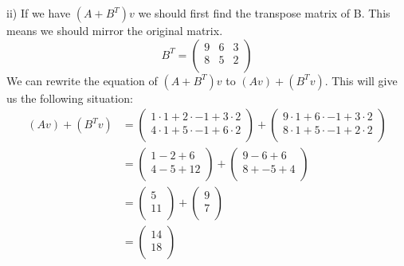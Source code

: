 \documentclass[a4paper]{article}
\begin{document}
ii) If we have $(A + B^T)v$ we should first find the transpose matrix of B. This means we should mirror the original matrix.
\[
B^T =
\left(
\begin{array}{ccc}
9 & 6 & 3 \\
8 & 5 & 2 \\
\end{array}
\right)
\]
We can rewrite the equation of $(A + B^T)v$ to $(Av)+(B^Tv)$. This will give us the following situation:
\begin{align*}
(Av)+(B^Tv) &=
\left(
\begin{array}{c}
1 \cdot 1 + 2 \cdot -1 + 3 \cdot 2 \\
4 \cdot 1 + 5 \cdot -1 + 6 \cdot 2 \\
\end{array}
\right)
+
\left(
\begin{array}{c}
9 \cdot 1 + 6 \cdot -1 + 3 \cdot 2 \\
8 \cdot 1 + 5 \cdot -1 + 2 \cdot 2 \\
\end{array}
\right) \\
&=
\left(
\begin{array}{c}
1 -2 + 6 \\
4 - 5 + 12 \\
\end{array}
\right)
+
\left(
\begin{array}{c}
9 - 6 + 6 \\
8 + -5 + 4 \\
\end{array}
\right) \\
&=
\left(
\begin{array}{c}
5 \\
11 \\
\end{array}
\right)
+
\left(
\begin{array}{c}
9 \\
7 \\
\end{array}
\right) \\
&=
\left(
\begin{array}{c}
14 \\
18 \\
\end{array}
\right)
\end{align*}
\end{document}
